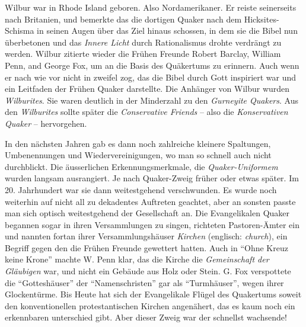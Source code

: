 \medskip

Wilbur war in Rhode Island geboren. Also Nordamerikaner. Er reiste seinerseits
nach Britanien, und bemerkte das die dortigen Quaker nach dem Hicksites-Schisma
in seinen Augen über das Ziel hinaus schossen, in dem sie die Bibel nun
überbetonen und das \textit{Innere Licht} durch Rationalismus drohte verdrängt
zu werden. Wilbur zitierte wieder die Frühen Freunde Robert Barclay, William
Penn, and George Fox, um an die Basis des Quäkertums zu erinnern. Auch wenn er
nach wie vor nicht in zweifel zog, das die Bibel durch Gott inspiriert war und
ein Leitfaden der Frühen Quaker darstellte. Die Anhänger von Wilbur wurden
\textit{Wilburites}. Sie waren deutlich in der Minderzahl zu den
\textit{Gurneyite Quakers}. Aus den \textit{Wilburites} sollte später die
\textit{Conservative Friends} -- also die \textit{Konservativen Quaker} --
hervorgehen.

\medskip

In den nächsten Jahren gab es dann noch zahlreiche kleinere Spaltungen,
Umbenennungen und Wiedervereinigungen, wo man so schnell auch nicht durchblickt.
Die äusserlichen Erkennungsmerkmale, die \textit{Quaker-Uniformem} wurden
langsam ausrangiert. Je nach Quaker-Zweig früher oder etwas später. Im 20.
Jahrhundert war sie dann weitestgehend verschwunden. Es wurde noch weiterhin auf
nicht all zu dekadentes Auftreten geachtet, aber an sonsten passte man sich
optisch weitestgehend der Gesellschaft an. Die Evangelikalen Quaker begannen
sogar in ihren Versammlungen zu singen, richteten Pastoren-Ämter ein und nannten
fortan ihrer Versammlungshäuser \textit{Kirchen} (englisch: \textit{church}),
ein Begriff gegen den die Frühen Freunde gewettert hatten. Auch in "`Ohne Kreuz
keine Krone"' machte W. Penn klar, das die Kirche die \textit{Gemeinschaft der
Gläubigen} war, und nicht ein Gebäude aus Holz oder Stein. G. Fox verspottete
die "`Gotteshäuser"' der "`Namenschristen"' gar als "`Turmhäuser"', wegen ihrer
Glockentürme. Bis Heute hat sich der Evangelikale Flügel des Quakertums soweit
den konventionellen protestantischen Kirchen angenähert, das es kaum noch ein
erkennbaren unterschied gibt. Aber dieser Zweig war der schnellst wachsende!

\medskip

